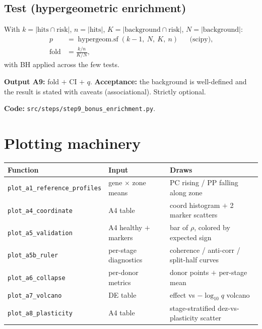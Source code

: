 \documentclass[11pt]{article}
\newcommand{\code}[1]{\texttt{\small #1}}
\begin{document}
\subsection{Test (hypergeometric enrichment)}
With $k = |\text{hits} \cap \text{risk}|$, $n = |\text{hits}|$,
$K = |\text{background} \cap \text{risk}|$, $N = |\text{background}|$:
\begin{align}
  p    &= \operatorname{hypergeom.sf}(k-1,\ N,\ K,\ n) && \text{(scipy)}, \\
  \text{fold} &= \frac{k/n}{K/N},
\end{align}
with BH applied across the few tests.

\textbf{Output A9:} fold $+$ CI $+$ $q$. \textbf{Acceptance:} the background is well-defined and the
result is stated with caveats (associational). Strictly optional.

\medskip
\noindent\textbf{Code:} \code{src/steps/step9\_bonus\_enrichment.py}.

\section{Plotting machinery}

\begin{center}
\begin{tabular}{@{}l l l@{}}
\toprule
\textbf{Function} & \textbf{Input} & \textbf{Draws} \\
\midrule
\code{plot\_a1\_reference\_profiles} & gene $\times$ zone means & PC rising / PP falling along zone \\
\code{plot\_a4\_coordinate}         & A4 table                & coord histogram $+$ 2 marker scatters \\
\code{plot\_a5\_validation}         & A4 healthy $+$ markers  & bar of $\rho$, colored by expected sign \\
\code{plot\_a5b\_ruler}             & per-stage diagnostics   & coherence / anti-corr / split-half curves \\
\code{plot\_a6\_collapse}           & per-donor metrics       & donor points $+$ per-stage mean \\
\code{plot\_a7\_volcano}            & DE table                & effect vs $-\log_{10} q$ volcano \\
\code{plot\_a8\_plasticity}         & A4 table                & stage-stratified dez-vs-plasticity scatter \\
\bottomrule
\end{tabular}
\end{center}
\end{document}
